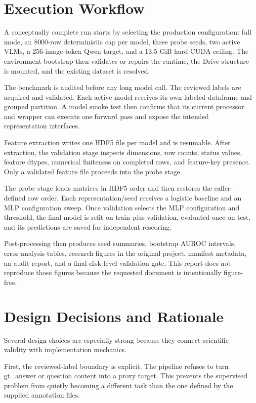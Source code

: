 \documentclass[11pt,a4paper]{article}
\begin{document}
\section{Execution Workflow}

A conceptually complete run starts by selecting the production configuration: full mode, an 8000-row deterministic cap per model, three probe seeds, two active VLMs, a 256-image-token Qwen target, and a 13.5 GiB hard CUDA ceiling. The environment bootstrap then validates or repairs the runtime, the Drive structure is mounted, and the existing dataset is resolved.

The benchmark is audited before any long model call. The reviewed labels are acquired and validated. Each active model receives its own labeled dataframe and grouped partition. A model smoke test then confirms that its current processor and wrapper can execute one forward pass and expose the intended representation interfaces.

Feature extraction writes one HDF5 file per model and is resumable. After extraction, the validation stage inspects dimensions, row counts, status values, feature dtypes, numerical finiteness on completed rows, and feature-key presence. Only a validated feature file proceeds into the probe stage.

The probe stage loads matrices in HDF5 order and then restores the caller-defined row order. Each representation/seed receives a logistic baseline and an MLP configuration sweep. Once validation selects the MLP configuration and threshold, the final model is refit on train plus validation, evaluated once on test, and its predictions are saved for independent rescoring.

Post-processing then produces seed summaries, bootstrap AUROC intervals, error-analysis tables, research figures in the original project, manifest metadata, an audit report, and a final disk-level validation gate. This report does not reproduce those figures because the requested document is intentionally figure-free.

\section{Design Decisions and Rationale}

Several design choices are especially strong because they connect scientific validity with implementation mechanics.

First, the reviewed-label boundary is explicit. The pipeline refuses to turn gt\_answer or question content into a proxy target. This prevents the supervised problem from quietly becoming a different task than the one defined by the supplied annotation files.
\end{document}
